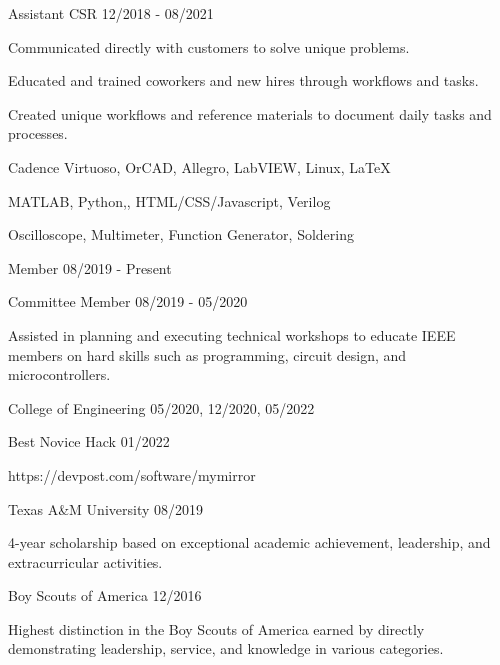\documentclass[11pt]{article}
\begin{document}
\begin{description}
\squish
{}
           {Assistant CSR}
           {12/2018 - 08/2021}

Communicated directly with customers to solve unique problems.

Educated and trained coworkers and new hires through workflows and tasks.

Created unique workflows and reference materials to document daily tasks and processes.

\end{description}


      {Cadence Virtuoso, OrCAD, Allegro, LabVIEW, Linux, \LaTeX}

      {MATLAB, Python,\CPP, HTML/CSS/Javascript, Verilog}

      {Oscilloscope, Multimeter, Function Generator, Soldering}


\begin{description}
\squish
{}
           {Member}
           {08/2019 - Present}

           {Committee Member}
           {08/2019 - 05/2020}

Assisted in planning and executing technical workshops to educate IEEE members on hard skills
such as programming, circuit design, and microcontrollers.

\end{description}


\begin{description}
\squish
{}
           {College of Engineering}
           {05/2020, 12/2020, 05/2022}

           {Best Novice Hack}
           {01/2022}

https://devpost.com/software/mymirror

           {Texas A\&M University}
           {08/2019}

4-year scholarship based on exceptional academic achievement, leadership, and extracurricular activities.

           {Boy Scouts of America}
           {12/2016}

Highest distinction in the Boy Scouts of America earned by directly demonstrating
leadership, service, and knowledge in various categories.

\end{description}
\end{document}
